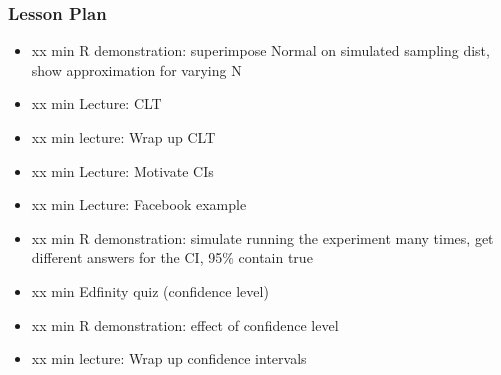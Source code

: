 

\begin{frame}
\frametitle{Lesson Plan}
\begin{itemize}
    \item xx min R demonstration: superimpose Normal on simulated sampling dist, show approximation for varying N 
    \item xx min Lecture: CLT 
    \item xx min lecture: Wrap up CLT

    \item xx min Lecture: Motivate CIs
    \item xx min Lecture: Facebook example
    
    \item xx min R demonstration: simulate running the experiment many times, get different answers for the CI, 95\% contain true
    \item xx min Edfinity quiz (confidence level)
    \item xx min R demonstration: effect of confidence level
    \item xx min lecture: Wrap up confidence intervals
\end{itemize}
\end{frame}
        


